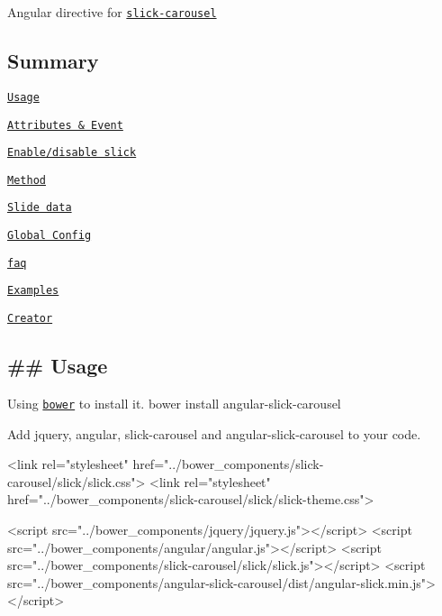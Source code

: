 \href{https://gitter.im/devmark/angular-slick-carousel?utm_source=badge&utm_medium=badge&utm_campaign=pr-badge&utm_content=badge}{\tt }

Angular directive for \href{http://kenwheeler.github.io/slick/}{\tt slick-\/carousel}

\subsection*{Summary}


\begin{DoxyItemize}
\item \href{#usage}{\tt Usage}
\item \href{#attributes&event}{\tt Attributes \& Event}
\item \href{#enable/disableslick}{\tt Enable/disable slick}
\item \href{#method}{\tt Method}
\item \href{#slidedata}{\tt Slide data}
\item \href{#globalconfig}{\tt Global Config}
\item \href{#faq}{\tt faq}
\item \href{#examples}{\tt Examples}
\item \href{#creator}{\tt Creator}
\end{DoxyItemize}

\subsection*{\#\# Usage }


\begin{DoxyItemize}
\item Using \href{http://bower.io/}{\tt bower} to install it. {\ttfamily bower install angular-\/slick-\/carousel}
\item Add {\ttfamily jquery}, {\ttfamily angular}, {\ttfamily slick-\/carousel} and {\ttfamily angular-\/slick-\/carousel} to your code.
\end{DoxyItemize}


\begin{DoxyCode}
<link rel="stylesheet" href="../bower\_components/slick-carousel/slick/slick.css">
<link rel="stylesheet" href="../bower\_components/slick-carousel/slick/slick-theme.css">

<script src="../bower\_components/jquery/jquery.js"></script>
<script src="../bower\_components/angular/angular.js"></script>
<script src="../bower\_components/slick-carousel/slick/slick.js"></script>
<script src="../bower\_components/angular-slick-carousel/dist/angular-slick.min.js"></script>
\end{DoxyCode}



